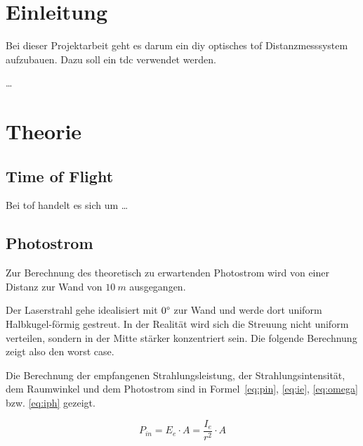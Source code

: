 \documentclass[11pt,a4paper,hidelinks]{article}
\begin{document}










\section{Einleitung}

Bei dieser Projektarbeit geht es darum ein \acrfull{diy} optisches \acrfull{tof} Distanzmesssystem aufzubauen. Dazu soll
ein \acrfull{tdc} verwendet werden.

\dots

\pagebreak

\section{Theorie}

\subsection{Time of Flight}

Bei \acrshort{tof} handelt es sich um \dots

\pagebreak

\subsection{Photostrom}

Zur Berechnung des theoretisch zu erwartenden Photostrom wird von einer Distanz zur Wand von $10~m$ ausgegangen.

Der Laserstrahl gehe idealisiert mit $0\degree$ zur Wand und werde dort uniform Halbkugel-förmig gestreut. In der
Realität wird sich die Streuung nicht uniform verteilen, sondern in der Mitte stärker konzentriert sein. Die folgende
Berechnung zeigt also den worst case.

Die Berechnung der empfangenen Strahlungsleistung, der Strahlungsintensität, dem Raumwinkel und dem Photostrom sind in
Formel~\ref{eq:pin}, \ref{eq:ie}, \ref{eq:omega} bzw. \ref{eq:iph} gezeigt.

\begin{equation}\label{eq:pin}
    P_{in} = E_e \cdot A = \frac{I_e}{r^2} \cdot A
\end{equation}
\end{document}

